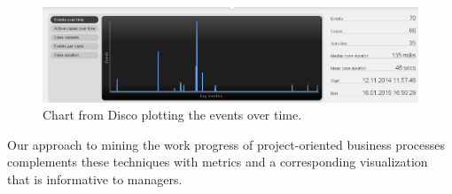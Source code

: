 \begin{figure}
\centering
\includegraphics[width=\textwidth]{bpm2015/imgs/disco_screenshot_chart}
\caption{Chart from Disco plotting the events over time.}
\label{fig:discochart}
\end{figure}

Our approach to mining the work progress of project-oriented business processes complements these techniques with metrics and a corresponding visualization that is informative to managers.